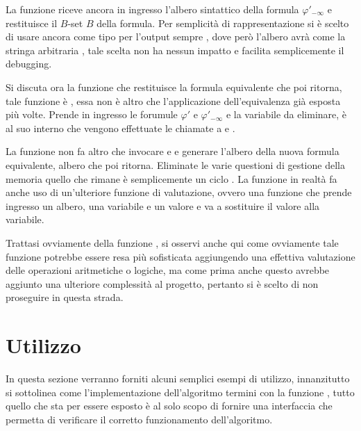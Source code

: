 \documentclass[11pt,letterpaper,twoside]{article}
\begin{document}

La funzione 
riceve ancora in ingresso l'albero sintattico della formula $\varphi'_{- \infty}$
e restituisce il $B$-set $B$ della formula. Per semplicità di rappresentazione
si è scelto di usare ancora come tipo per l'output sempre
, dove però l'albero avrà come  la
stringa arbitraria , tale scelta non ha nessun impatto e
facilita semplicemente il debugging.
  

Si discuta ora la funzione che restituisce la formula equivalente che poi
 ritorna, tale funzione è , essa non è
altro che l'applicazione dell'equivalenza già esposta più volte. Prende in
ingresso le forumule $\varphi'$ e $\varphi'_{-\infty}$ e la variabile da
eliminare, è al suo interno che vengono effettuate le chiamate a
 e .


La funzione  non fa altro che invocare  e
 e generare l'albero della nuova formula equivalente,
albero che poi ritorna. Eliminate le varie questioni di gestione della memoria
quello che rimane è semplicemente un ciclo . La funzione in realtà
fa anche uso di un'ulteriore funzione di valutazione, ovvero una funzione che
prende ingresso un albero, una variabile e un valore e va a sostituire il valore
alla variabile.

Trattasi ovviamente della funzione , si osservi anche qui come ovviamente tale funzione
potrebbe essere resa più sofisticata aggiungendo una effettiva valutazione delle
operazioni aritmetiche o logiche, ma come prima anche questo avrebbe aggiunto
una ulteriore complessità al progetto, pertanto si è scelto di non proseguire in
questa strada.



\section{Utilizzo}

In questa sezione verranno forniti alcuni semplici esempi di utilizzo,
innanzitutto si sottolinea come l'implementazione dell'algoritmo termini con la
funzione , tutto quello che sta per essere esposto è al solo
scopo di fornire una interfaccia che permetta di verificare il corretto
funzionamento dell'algoritmo.
\end{document}
